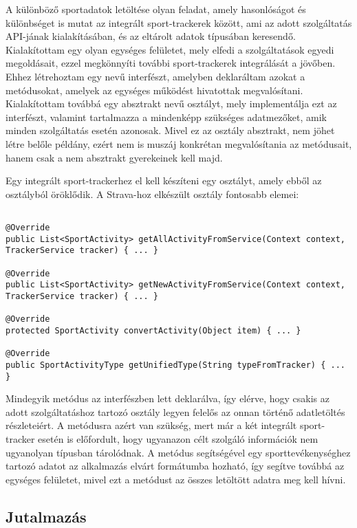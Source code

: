 A különböző sportadatok letöltése olyan feladat, amely hasonlóságot és különbséget is mutat az integrált sport-trackerek között, ami az adott szolgáltatás API-jának kialakításában, és az eltárolt adatok típusában keresendő. 
Kialakítottam egy olyan egységes felületet, mely elfedi a szolgáltatások egyedi megoldásait, ezzel megkönnyíti további sport-trackerek integrálását a jövőben. 
Ehhez létrehoztam egy  nevű interfészt, amelyben deklaráltam azokat a metódusokat, amelyek az egységes működést hivatottak megvalósítani. 
Kialakítottam továbbá egy absztrakt   nevű osztályt, mely implementálja ezt az interfészt, valamint tartalmazza a mindenképp szükséges adatmezőket, amik minden szolgáltatás esetén azonosak. 
Mivel ez az osztály absztrakt, nem jöhet létre belőle példány, ezért nem is muszáj konkrétan megvalósítania az  metódusait, hanem csak a nem absztrakt gyerekeinek kell majd. 

Egy integrált sport-trackerhez el kell készíteni egy osztályt, amely ebből az osztályból öröklődik. 
A Strava-hoz elkészült osztály fontosabb elemei:

\begin{lstlisting}

@Override
public List<SportActivity> getAllActivityFromService(Context context, TrackerService tracker) { ... }

@Override
public List<SportActivity> getNewActivityFromService(Context context, TrackerService tracker) { ... }

@Override
protected SportActivity convertActivity(Object item) { ... }

@Override
public SportActivityType getUnifiedType(String typeFromTracker) { ... }

\end{lstlisting}

Mindegyik metódus az interfészben lett deklarálva, így elérve, hogy csakis az adott szolgáltatáshoz tartozó osztály legyen felelős az onnan történő adatletöltés részleteiért. 
A  metódusra azért van szükség, mert már a két integrált sport-tracker esetén is előfordult, hogy ugyanazon célt szolgáló információk nem ugyanolyan típusban tárolódnak. 
A metódus segítségével egy sporttevékenységhez tartozó adatot az alkalmazás elvárt formátumba hozható, így segítve továbbá az egységes felületet, mivel ezt a metódust az összes letöltött adatra meg kell hívni. 

\subsection*{Jutalmazás}
\label{reward}

